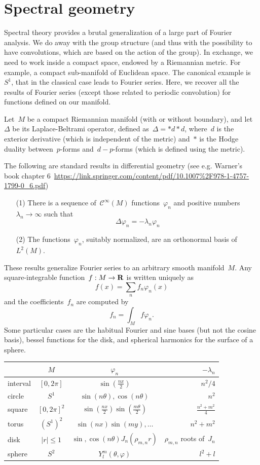 \section{Spectral geometry}

Spectral theory provides a brutal generalization of a large part of
Fourier analysis.  We do away with the group structure (and thus with
the possibility to have convolutions, which are based on the action
of the group).  In exchange, we need to work inside a compact space,
endowed by a Riemannian metric.  For example, a compact sub-manifold
of Euclidean space.  The canonical example is~$S^1$, that in
the classical case leads to Fourier series.  Here, we recover all
the results of Fourier series (except those related to periodic
convolution) for functions defined on our manifold.

Let~$M$ be a compact Riemannian manifold (with or without boundary), and
let~$\Delta$ be its Laplace-Beltrami operator, defined
as~$\Delta=*d*d$, where~$d$ is the exterior derivative (which is independent
of the metric) and~$*$ is the Hodge duality between~$p$-forms
and~$d-p$-forms (which is defined using the metric).

The following are standard results in differential geometry (see e.g.
Warner's book chapter
6~\url{https://link.springer.com/content/pdf/10.1007\%2F978-1-4757-1799-0_6.pdf})

\begin{itemize}
	\item[(1)] There is a sequence of~$\mathcal{C}^\infty(M)$
		functions~$\varphi_n$ and positive
		numbers~$\lambda_n\to\infty$ such that
		$$\Delta\varphi_n=-\lambda_n\varphi_n$$
	\item[(2)] The functions~$\varphi_n$, suitably normalized, are an
		orthonormal basis of~$L^2(M)$.
\end{itemize}

These results generalize Fourier series to an arbitrary smooth manifold~$M$.
Any square-integrable function~$f:M\to\mathbf{R}$ is written uniquely as
$$f(x)=\sum_nf_n\varphi_n(x)$$ and the coefficients~$f_n$ are computed by
$$f_n=\int_Mf\varphi_n.$$  Some particular cases are the habitual Fourier and
sine bases (but not the cosine basis), bessel functions for the disk, and
spherical harmonics for the surface of a sphere.

\begin{tabular}{lccr}
	&$M$ & $\varphi_n$ & $-\lambda_n$ \\
	\hline
	interval & $[0,2\pi]$ & $\sin\left(\frac{nx}{2}\right)$ & $n^2/4$ \\
	circle & $S^1$ & $\sin(n\theta),\cos(n\theta)$ & $n^2$ \\
	square & $[0,2\pi]^2$ &
	$\sin\left(\frac{nx}{2}\right)\sin\left(\frac{m\theta}{2}\right)$ &
	$\frac{n^2+m^2}{4}$ \\
	torus & $(S^1)^2$ & $\sin(nx)\sin(my),\ldots$ & $n^2+m^2$ \\
	disk & $|r|\le1$ & $\sin,\cos(n\theta)J_n(\rho_{m,n}r)$ &
	$\rho_{m,n}$ roots of~$J_n$ \\
	sphere & $S^2$ & $Y^m_l(\theta,\varphi)$ & $l^2+l$
\end{tabular}

